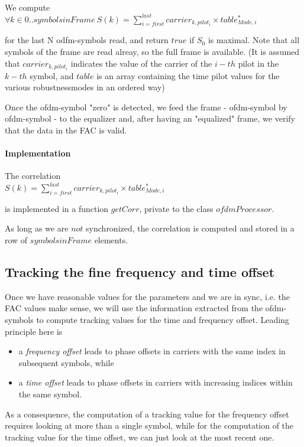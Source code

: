 \documentclass[11pt]{article}
\begin{document}
We compute
{
\ \\
$\forall k \in 0 .. symbolsinFrame\ S(k) = \sum_{i = first}^{last} carrier_{k, pilot_i} \times table_{Mode, i}^*$
\ \\
}

for the last N  odfm-symbols read, and return $true$ if 
$S_0$ is maximal. Note that all symbols of the frame are read alreay,
so the full frame is available.
(It is assumed that $carrier_{k, pilot_i}$ indicates the value
of the carrier of the $i-th$ pilot in the $k-th$ symbol,
and $table$ is an array containing
the time pilot values  for the various robustnessmodes in an ordered way)

Once the ofdm-symbol "zero" is detected, we feed the frame - ofdm-symbol
by ofdm-symbol -
to the equalizer and, after having an "equalized" frame, we
verify that the data in the FAC is valid.
\paragraph{Implementation}
The correlation
{
\ \\
$S(k) = \sum_{i = first}^{last} carrier_{k, pilot_i} \times table_{Mode, i}^*$
\ \\
}

is implemented in a function $getCorr$, private to the class $ofdmProcessor$.

As long as we are $not$ synchronized, the correlation
is computed and stored in a
row of $symbolsinFrame$ elements.
\subsection{Tracking the fine frequency and time offset}
Once we have reasonable values for the parameters and we are in sync, i.e.
the FAC values make sense,
we will use the information extracted from the ofdm-symbols to compute
tracking values for the time and frequency offset.
Leading principle here is
\begin{itemize}
\item a {\em frequency offset} leads to phase offsets in carriers with
the same index in subsequent symbols,
while
\item a {\em time offset} leads to phase offsets in carriers with
increasing indices within the same symbol.
\end{itemize}
As a consequence, the computation of a tracking value for the frequency offset
requires looking at more than a single symbol, while for the 
computation of the  tracking value for the time offset, we can just look
at the most recent one.
\end{document}
